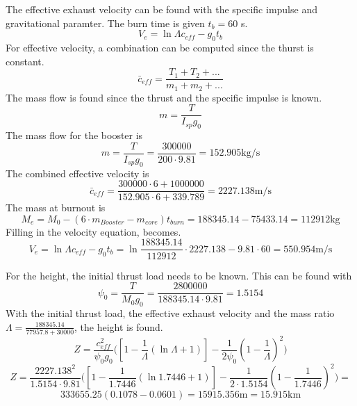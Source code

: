 The effective exhaust velocity can be found with the specific impulse and gravitational paramter. The burn time is given $t_b=60$ s.
\begin{equation}
V_e=\ln\Lambda c_{eff}-g_0t_b
\end{equation}
For effective velocity, a combination can be computed since the thurst is constant. 
\begin{equation}
\bar{c}_{eff}=\frac{T_1+T_2+...}{m_1+m_2+...}
\end{equation}
The mass flow is found since the thrust and the specific impulse is known.
\begin{equation}
m=\frac{T}{I_{sp}g_0}
\end{equation}
The mass flow for the booster is 
\begin{equation}
m=\frac{T}{I_{sp}g_0} = \frac{300000}{200\cdot 9.81}=152.905 \text{kg/s}
\end{equation}
The combined effective velocity is 
\begin{equation}
\bar{c}_{eff} = \frac{300000\cdot6+1000000}{152.905\cdot6+339.789}=2227.138 \text{m/s}
\end{equation}
The mass at burnout is 
\begin{equation}
M_e = M_0-(6\cdot m_{Booster}-m_{core})t_{burn}=188345.14-75433.14=112912 \text{kg}
\end{equation}
Filling in the velocity equation, becomes.
\begin{equation}
V_e=\ln\Lambda c_{eff}-g_0t_b = \ln\frac{188345.14}{112912} \cdot2227.138-9.81\cdot60=550.954 \text{m/s}
\end{equation}

For the height, the initial thrust load needs to be known. This can be found with
\begin{equation}
\psi_0=\frac{T}{M_0g_0}=\frac{2800000}{188345.14\cdot9.81}=1.5154
\end{equation}
With the initial thrust load, the effective exhaust velocity and the mass ratio $\Lambda=\frac{188345.14}{77957.8+30000}$, the height is found.
\begin{equation}
Z = \frac{c_{eff}^2}{\psi_0g_0}\Bigg([1-\frac{1}{\Lambda}(\ln\Lambda+1)]-\frac{1}{2\psi_0}(1-\frac{1}{\Lambda})^2\Bigg)
\end{equation}
\begin{equation}
Z = \frac{2227.138^2}{1.5154\cdot9.81}\Bigg([1-\frac{1}{1.7446}(\ln 1.7446+1)]-\frac{1}{2\cdot1.5154}(1-\frac{1}{1.7446})^2\Bigg)=
\end{equation}
\begin{equation}
333655.25(0.1078-0.0601)=15915.356 \text{m} = 15.915 \text{km}
\end{equation}



